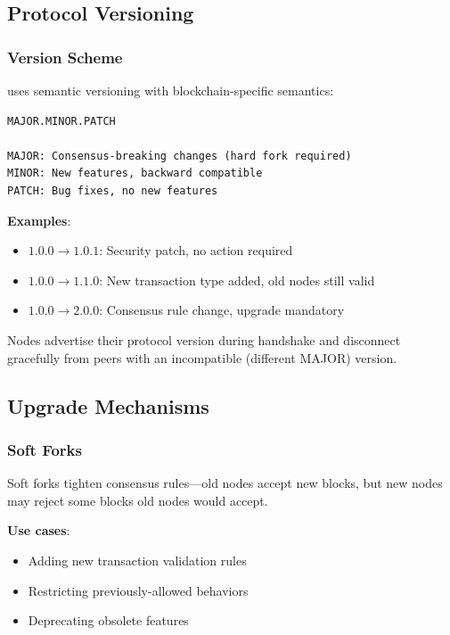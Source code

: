 \subsection{Protocol Versioning}

\subsubsection{Version Scheme}

\Botho uses semantic versioning with blockchain-specific semantics:

\begin{lstlisting}[caption={Version number interpretation}]
MAJOR.MINOR.PATCH

MAJOR: Consensus-breaking changes (hard fork required)
MINOR: New features, backward compatible
PATCH: Bug fixes, no new features
\end{lstlisting}

\textbf{Examples}:
\begin{itemize}
  \item $1.0.0 \to 1.0.1$: Security patch, no action required
  \item $1.0.0 \to 1.1.0$: New transaction type added, old nodes still valid
  \item $1.0.0 \to 2.0.0$: Consensus rule change, upgrade mandatory
\end{itemize}

Nodes advertise their protocol version during handshake and disconnect
gracefully from peers with an incompatible (different MAJOR) version.

\subsection{Upgrade Mechanisms}

\subsubsection{Soft Forks}

Soft forks tighten consensus rules---old nodes accept new blocks, but new
nodes may reject some blocks old nodes would accept.

\textbf{Use cases}:
\begin{itemize}
  \item Adding new transaction validation rules
  \item Restricting previously-allowed behaviors
  \item Deprecating obsolete features
\end{itemize}

